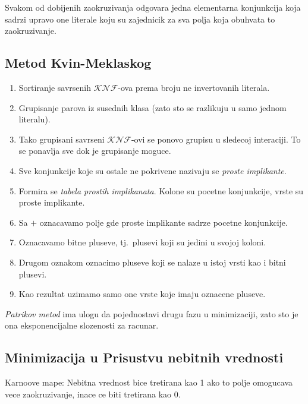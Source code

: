 \documentclass[12p,a4paper]{article}
\begin{document}
\begin{multicols}{2}
    Svakom od dobijenih zaokruzivanja odgovara jedna elementarna konjunkcija
    koja sadrzi upravo one literale koju su zajednicik za sva polja koja 
    obuhvata to zaokruzivanje.

    \subsection{Metod Kvin-Meklaskog}

    \begin{enumerate}
        \itemsep0em
        \item Sortiranje savrsenih $\mathcal{KNF}$-ova prema broju ne 
            invertovanih literala.
        \item Grupisanje parova iz susednih klasa (zato sto se razlikuju
            u samo jednom literalu).
        \item Tako grupisani savrseni $\mathcal{KNF}$-ovi se ponovo grupisu
            u sledecoj interaciji. To se ponavlja sve dok je grupisanje 
            moguce.
        \item Sve konjunkcije koje su ostale ne pokrivene nazivaju se 
            \emph{proste implikante}.
        \item Formira se \emph{tabela prostih implikanata}. Kolone su pocetne
            konjunkcije, vrste su proste implikante.
        \item Sa $+$ oznacavamo polje gde proste implikante sadrze pocetne
            konjunkcije.
        \item Oznacavamo bitne pluseve, tj.\ plusevi koji su jedini u svojoj
            koloni.
        \item Drugom oznakom oznacimo pluseve koji se nalaze u istoj
            vrsti kao i bitni plusevi.
        \item Kao rezultat uzimamo samo one vrste koje imaju oznacene pluseve.
    \end{enumerate}

    \emph{Patrikov metod} ima ulogu da pojednostavi drugu fazu u minimizaciji, 
    zato sto je ona eksponencijalne slozenosti za racunar.

    \subsection{Minimizacija u Prisustvu nebitnih vrednosti}

    Karnoove mape: Nebitna vrednost bice tretirana kao 1 ako to polje 
    omogucava vece zaokruzivanje, inace ce biti tretirana kao 0.


\end{multicols}
\end{document}

